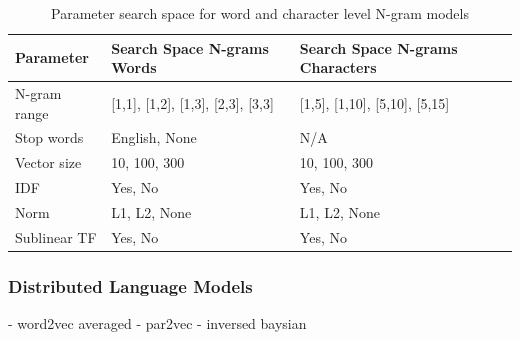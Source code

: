 \begin{center}
  \begin{table}[h]
  \begin{tabular}{ l l l}
    \hline
    Parameter & Search Space N-grams Words & Search Space N-grams Characters \\
    \hline
    N-gram range & [1,1], [1,2], [1,3], [2,3], [3,3] & [1,5], [1,10], [5,10], [5,15] \\
    Stop words & English, None & N/A \\
    Vector size & 10, 100, 300 & 10, 100, 300 \\
    IDF & Yes, No & Yes, No \\
    Norm & L1, L2, None & L1, L2, None \\
    Sublinear TF & Yes, No & Yes, No \\
    \hline
  \end{tabular}
  \caption{Parameter search space for word and character level N-gram models}
\label{tab:ngram-parameters}
  \end{table}
\end{center}









\subsubsection{Distributed Language Models}

- word2vec averaged
- par2vec
- inversed baysian

